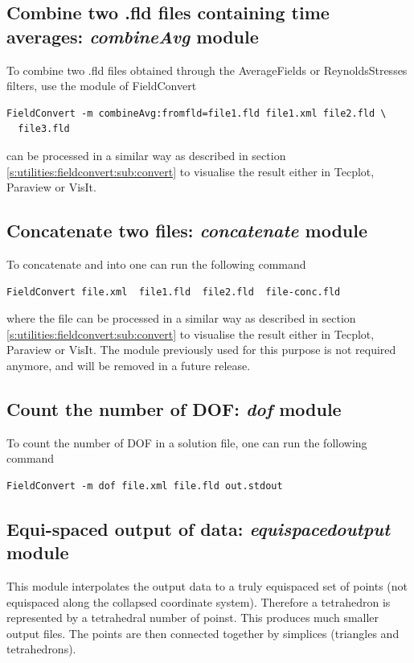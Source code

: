 \subsection{Combine two .fld files containing time averages: \textit{combineAvg} module}
To combine two .fld files obtained through the AverageFields or ReynoldsStresses filters,
use the  module of FieldConvert
%
\begin{lstlisting}[style=BashInputStyle]
  FieldConvert -m combineAvg:fromfld=file1.fld file1.xml file2.fld \
  file3.fld
\end{lstlisting}
%
 can be processed in a similar way as described
in section \ref{s:utilities:fieldconvert:sub:convert} to visualise
the result either in Tecplot, Paraview or VisIt.
%
%
%
\subsection{Concatenate two files: \textit{concatenate} module}
To concatenate  and  into 
one can run the following command
%
\begin{lstlisting}[style=BashInputStyle]
FieldConvert file.xml  file1.fld  file2.fld  file-conc.fld
\end{lstlisting}
%
where the file  can be processed in a similar
way as described in section \ref{s:utilities:fieldconvert:sub:convert}
to visualise the result either in Tecplot, Paraview or VisIt. The
\inltt{concatenate} module previously used for this purpose is not
required anymore, and will be removed in a future release.
%
%
%
\subsection{Count the number of DOF: \textit{dof} module}
To count the number of DOF in a solution file,
one can run the following command
%
\begin{lstlisting}[style=BashInputStyle]
FieldConvert -m dof file.xml file.fld out.stdout
\end{lstlisting}
%
%
%
\subsection{Equi-spaced output of data: \textit{equispacedoutput} module}
This module interpolates the output data to a truly equispaced set of
points (not equispaced along the collapsed coordinate
system). Therefore a tetrahedron is represented by a tetrahedral
number of poinst. This produces much smaller output files. The points
are then connected together by simplices (triangles and tetrahedrons).

